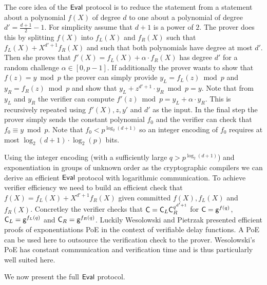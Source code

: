 \documentclass{article}
\theoremstyle{definition}
\begin{document}
The core idea of the $\textsf{{Eval}}$ protocol is to reduce the statement from a statement about a polynomial $f(X)$ of degree $d$ to one about a polynomial of degree $d'=\frac{d+1}{2}-1$. For simplicity assume that $d+1$ is a power of $2$.
The prover does this by splitting $f(X)$ into $f_L(X)$ and $f_R(X)$ such that $f_L(X)+X^{d'+1} f_R(X)$ and such that both polynomials have degree at most $d'$. Then she proves that $f'(X)=f_L(X)+\alpha \cdot f_R(X)$ has degree $d'$ for a random challenge $\alpha\in [0,p-1]$. 
If additionally the prover wants to show that $f(z)=y\bmod p$ the prover can simply provide $y_L=f_L(z)\bmod p$ and $y_R=f_R(z)\bmod p$ and show that $y_L+z^{d'+1}\cdot y_R \bmod p=y$. Note that from $y_L$ and $y_R$ the verifier can compute $f'(z) \bmod p=y_L + \alpha \cdot y_R$. 
This is recursively repeated using $f'(X),z,y'$ and $d'$ as the input.
In the final step the prover simply sends the constant polynomial $f_0$ and the verifier can check that $f_0 \equiv y \bmod p$. Note that $f_0< p^{\log_2(d+1)}$ so an integer encoding of $f_0$ requires at most $\log_2(d+1)\cdot \log_2(p)$ bits.

Using the integer encoding (with a sufficiently large $q>p^{\log_2(d+1)}$) and exponentiation in groups of unknown order as the cryptographic compilers we can derive an efficient $\textsf{{Eval}}$ protocol with logarithmic communication. To achieve verifier efficiency we need to build an efficient check that $f(X)=f_L(X)+X^{d'+1} f_R(X)$ given committed $f(X), f_L(X)$ and $f_R(X)$. Concretley the verifier checks that $\mathsf{C}=\mathsf{C}_L\mathsf{C}_R^{q^{d'+1}}$ for $\mathsf{C}=\mathsf{g}^{f(q)}$, $\mathsf{C}_L=\mathsf{g}^{f_L(q)}$ and $\mathsf{C}_R=\mathsf{g}^{f_R(q)}$. Luckily Wesolowski \cite{EC:Wesolowski19} and Pietrzak\cite{EPRINT:Pietrzak18b} presented efficient proofs of exponentiations \textsf{PoE} in the context of verifiable delay functions\cite{C:BBBF18}. A \textsf{PoE} can be used here to outsource the verification check to the prover. Wesolowski's \textsf{PoE} has constant communication and verification time and is thus particularly well suited here.

We now present the full $\textsf{{Eval}}$ protocol. 
\end{document}
